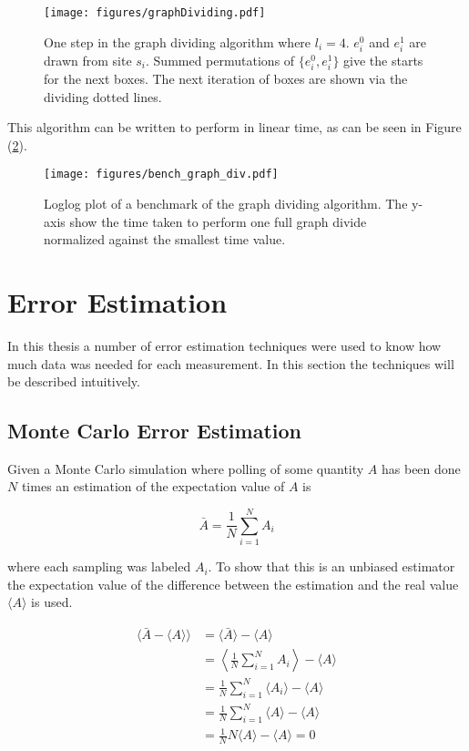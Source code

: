 \begin{figure}[h!]
    \centering
        \texttt{[image: figures/graphDividing.pdf]}
    \caption{One step in the graph dividing algorithm where $l_i = 4$. $e^0_i$ and $e^1_i$ are drawn from site $s_i$. Summed permutations of $\{e^0_i, e^1_i\}$ give the starts for the next boxes. The next iteration of boxes are shown via the dividing dotted lines.}
    \label{fig:graphdividingalgo}
\end{figure}

This algorithm can be written to perform in linear time, as can be seen in Figure (\ref{fig:bench_graphdiv}). 

\begin{figure}[h!]
    \centering
        \texttt{[image: figures/bench\_graph\_div.pdf]}
    \caption{Loglog plot of a benchmark of the graph dividing algorithm. The y-axis show the time taken to perform one full graph divide normalized against the smallest time value.}
    \label{fig:bench_graphdiv}
\end{figure}

\section{Error Estimation}
\label{sec:ErrorEst}

In this thesis a number of error estimation techniques were used to know how much data was needed for each measurement. In this section the techniques will be described intuitively.

\subsection{Monte Carlo Error Estimation}
\label{subsec:MonteCarloErrorEst}

Given a Monte Carlo simulation where polling of some quantity $A$ has been done $N$ times an estimation of the expectation value of $A$ is

\begin{equation}
    \bar A = \frac{1}{N} \sum_{i = 1}^{N} A_i
\end{equation}

where each sampling was labeled $A_i$. To show that this is an unbiased estimator the expectation value of the difference between the estimation and the real value $\langle A \rangle$ is used.

\begin{align}
    \langle \bar A - \langle A \rangle \rangle &= \langle \bar A \rangle - \langle A \rangle \\
%
    &= \left \langle \frac{1}{N} \sum_{i = 1}^{N} A_i \right \rangle - \langle A \rangle \\
%
    &= \frac{1}{N} \sum_{i = 1}^{N} \langle A_i \rangle - \langle A \rangle \\
\label{eq:unbiasedEst}
%
    &= \frac{1}{N} \sum_{i = 1}^{N} \langle A \rangle - \langle A \rangle \\
%
    &= \frac{1}{N} N \langle A \rangle - \langle A \rangle = 0
\end{align}

